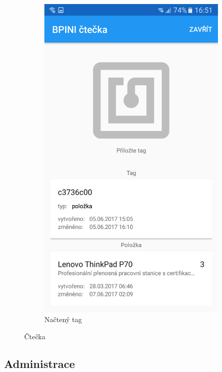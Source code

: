 \documentclass[czech,BP]{thesiskiv}
\begin{document}
\begin{figure}
\begin{subfigure}[b]{0.3\textwidth}
	\includegraphics[width=\textwidth]{../images/client_android/Screenshot_20170607-165117.png}	
	\caption{Načtený tag}
	\label{fig:Screenshot_20170607-165117}
  \end{subfigure}
  \caption{Čtečka}
\end{figure}

\subsection{Administrace}
\end{document}
